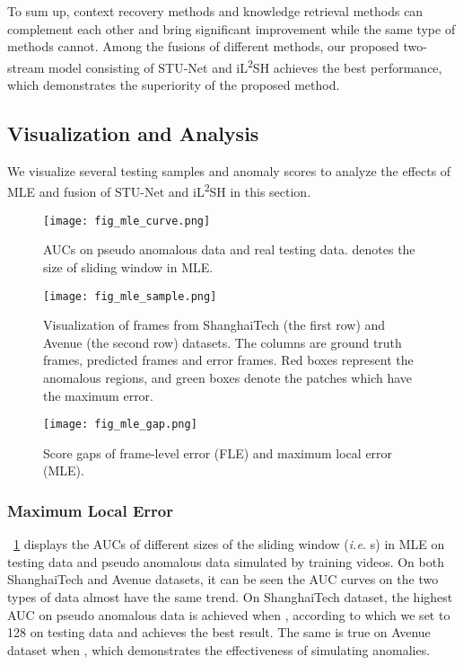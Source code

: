 \documentclass[lettersize,journal]{IEEEtran}
\begin{document}
To sum up, context recovery methods and knowledge retrieval methods can complement each other and bring significant improvement while the same type of methods cannot.
Among the fusions of different methods, our proposed two-stream model consisting of STU-Net and iL\textsuperscript{2}SH achieves the best performance, which demonstrates the superiority of the proposed method.


\subsection{Visualization and Analysis}
We visualize several testing samples and anomaly scores to analyze the effects of MLE and fusion of STU-Net and iL\textsuperscript{2}SH in this section.

\begin{figure}[!t]
	\centering
	\texttt{[image: fig\_mle\_curve.png]}
	\caption{AUCs on pseudo anomalous data and real testing data.  denotes the size of sliding window in MLE.}
	\label{fig_mle_curve}
\end{figure}

\begin{figure}[!t]
	\centering
	\texttt{[image: fig\_mle\_sample.png]}
	\caption{Visualization of frames from ShanghaiTech (the first row) and Avenue (the second row) datasets. The columns are ground truth frames, predicted frames and error frames. Red boxes represent the anomalous regions, and green boxes denote the patches which have the maximum error.}
	\label{fig_mle_sample}
\end{figure}

\begin{figure}[!t]
	\centering
	\texttt{[image: fig\_mle\_gap.png]}
	\caption{Score gaps of frame-level error (FLE) and maximum local error (MLE).}
	\label{fig_mle_gap}
\end{figure}

\subsubsection{Maximum Local Error}

\figurename~\ref{fig_mle_curve} displays the AUCs of different sizes of the sliding window (\textit{i.e.} s) in MLE on testing data and pseudo anomalous data simulated by training videos.
On both ShanghaiTech and Avenue datasets, it can be seen the AUC curves on the two types of data almost have the same trend.
On ShanghaiTech dataset, the highest AUC on pseudo anomalous data is achieved when , according to which we set  to 128 on testing data and achieves the best result.
The same is true on Avenue dataset when , which demonstrates the effectiveness of simulating anomalies.
\end{document}
